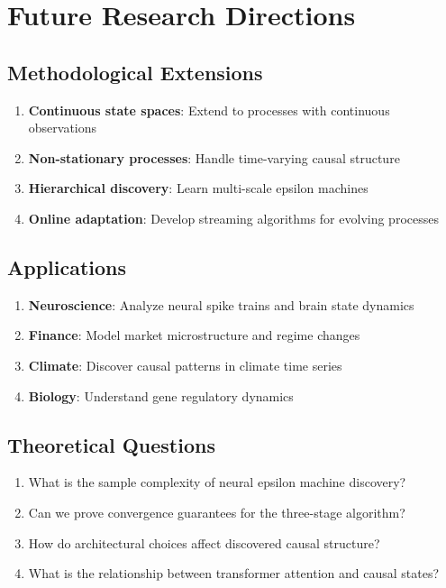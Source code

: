 \documentclass[11pt,a4paper]{report}
\theoremstyle{definition}
\begin{document}
\section{Future Research Directions}
\label{sec:future}

\subsection{Methodological Extensions}

\begin{enumerate}
    \item \textbf{Continuous state spaces}: Extend to processes with continuous observations
    \item \textbf{Non-stationary processes}: Handle time-varying causal structure
    \item \textbf{Hierarchical discovery}: Learn multi-scale epsilon machines
    \item \textbf{Online adaptation}: Develop streaming algorithms for evolving processes
\end{enumerate}

\subsection{Applications}

\begin{enumerate}
    \item \textbf{Neuroscience}: Analyze neural spike trains and brain state dynamics
    \item \textbf{Finance}: Model market microstructure and regime changes
    \item \textbf{Climate}: Discover causal patterns in climate time series
    \item \textbf{Biology}: Understand gene regulatory dynamics
\end{enumerate}

\subsection{Theoretical Questions}

\begin{enumerate}
    \item What is the sample complexity of neural epsilon machine discovery?
    \item Can we prove convergence guarantees for the three-stage algorithm?
    \item How do architectural choices affect discovered causal structure?
    \item What is the relationship between transformer attention and causal states?
\end{enumerate}
\end{document}
